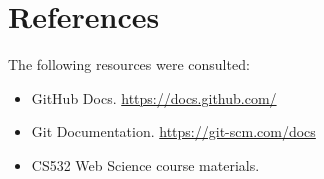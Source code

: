 \documentclass[12pt]{article}
\begin{document}
\section{References}

The following resources were consulted:

\begin{itemize}
\item GitHub Docs. \url{https://docs.github.com/}
\item Git Documentation. \url{https://git-scm.com/docs}
\item CS532 Web Science course materials.
\end{itemize}
\end{document}
